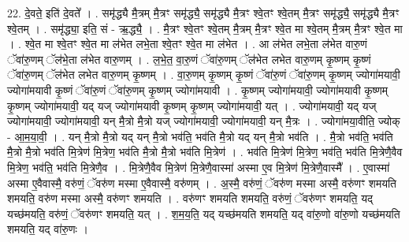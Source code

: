\documentclass[17pt]{extarticle}
\begin{document}
22. दे॒वते॒ इति॑ दे॒वते᳚ । . समृ॑द्ध्यै मै॒त्रम् मै॒त्रꣳ समृ॑द्ध्यै॒ समृ॑द्ध्यै मै॒त्रꣳ श्वे॒तꣳ श्वे॒तम् मै॒त्रꣳ समृ॑द्ध्यै॒ समृ॑द्ध्यै मै॒त्रꣳ श्वे॒तम् । . समृ॑द्ध्या॒ इति॒ सं - ऋ॒द्ध्यै॒ । . मै॒त्रꣳ श्वे॒तꣳ श्वे॒तम् मै॒त्रम् मै॒त्रꣳ श्वे॒त मा श्वे॒तम् मै॒त्रम् मै॒त्रꣳ श्वे॒त मा । . श्वे॒त मा श्वे॒तꣳ श्वे॒त मा ल॑भेत लभे॒ता श्वे॒तꣳ श्वे॒त मा ल॑भेत । . आ ल॑भेत लभे॒ता ल॑भेत वारु॒णं ॅवा॑रु॒णम् ॅल॑भे॒ता ल॑भेत वारु॒णम् । . ल॒भे॒त॒ वा॒रु॒णं ॅवा॑रु॒णम् ॅल॑भेत लभेत वारु॒णम् कृ॒ष्णम् कृ॒ष्णं ॅवा॑रु॒णम् ॅल॑भेत लभेत वारु॒णम् कृ॒ष्णम् । . वा॒रु॒णम् कृ॒ष्णम् कृ॒ष्णं ॅवा॑रु॒णं ॅवा॑रु॒णम् कृ॒ष्णम् ज्योगा॑मयावी॒ ज्योगा॑मयावी कृ॒ष्णं ॅवा॑रु॒णं ॅवा॑रु॒णम् कृ॒ष्णम् ज्योगा॑मयावी । . कृ॒ष्णम् ज्योगा॑मयावी॒ ज्योगा॑मयावी कृ॒ष्णम् कृ॒ष्णम् ज्योगा॑मयावी॒ यद् यज् ज्योगा॑मयावी कृ॒ष्णम् कृ॒ष्णम् ज्योगा॑मयावी॒ यत् । . ज्योगा॑मयावी॒ यद् यज् ज्योगा॑मयावी॒ ज्योगा॑मयावी॒ यन् मै॒त्रो मै॒त्रो यज् ज्योगा॑मयावी॒ ज्योगा॑मयावी॒ यन् मै॒त्रः । . ज्योगा॑मया॒वीति॒ ज्योक् - आ॒म॒या॒वी॒ । . यन् मै॒त्रो मै॒त्रो यद् यन् मै॒त्रो भव॑ति॒ भव॑ति मै॒त्रो यद् यन् मै॒त्रो भव॑ति । . मै॒त्रो भव॑ति॒ भव॑ति मै॒त्रो मै॒त्रो भव॑ति मि॒त्रेण॑ मि॒त्रेण॒ भव॑ति मै॒त्रो मै॒त्रो भव॑ति मि॒त्रेण॑ । . भव॑ति मि॒त्रेण॑ मि॒त्रेण॒ भव॑ति॒ भव॑ति मि॒त्रेणै॒वैव मि॒त्रेण॒ भव॑ति॒ भव॑ति मि॒त्रेणै॒व । . मि॒त्रेणै॒वैव मि॒त्रेण॑ मि॒त्रेणै॒वास्मा॑ अस्मा ए॒व मि॒त्रेण॑ मि॒त्रेणै॒वास्मै᳚ । . ए॒वास्मा॑ अस्मा ए॒वैवास्मै॒ वरु॑णं॒ ॅवरु॑ण मस्मा ए॒वैवास्मै॒ वरु॑णम् । . अ॒स्मै॒ वरु॑णं॒ ॅवरु॑ण मस्मा अस्मै॒ वरु॑णꣳ शमयति शमयति॒ वरु॑ण मस्मा अस्मै॒ वरु॑णꣳ शमयति । . वरु॑णꣳ शमयति शमयति॒ वरु॑णं॒ ॅवरु॑णꣳ शमयति॒ यद् यच्छ॑मयति॒ वरु॑णं॒ ॅवरु॑णꣳ शमयति॒ यत् । . श॒म॒य॒ति॒ यद् यच्छ॑मयति शमयति॒ यद् वा॑रु॒णो वा॑रु॒णो यच्छ॑मयति शमयति॒ यद् वा॑रु॒णः । \newline
\end{document}
